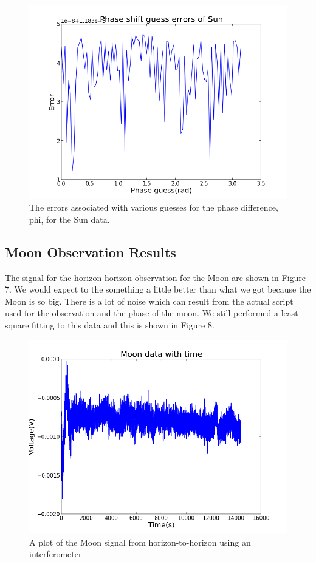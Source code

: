 \documentclass[12pt]{article}
\begin{document}
\begin {figure}[h!]
\centering
\includegraphics[scale = 0.5]
{errorsun.png}
\caption{\label{rvd} The errors associated with various guesses for the
  phase difference, phi, for the Sun data.}
\end {figure}

\subsection {Moon Observation Results}
The signal for the horizon-horizon observation for the Moon are shown in
Figure 7. We would expect to the something a little better than what we
got because the Moon is so big. There is a lot of noise which can
result from the actual script used for the observation and the phase of
the moon. We still performed a least
square fitting to this data and this is shown in Figure 8. 

\begin {figure}[h!]
\centering
\includegraphics[scale = 0.5]
{moondatatime.png}
\caption{\label{rvd} A plot of the Moon signal from horizon-to-horizon
  using an interferometer}
\end {figure}
\end{document}
